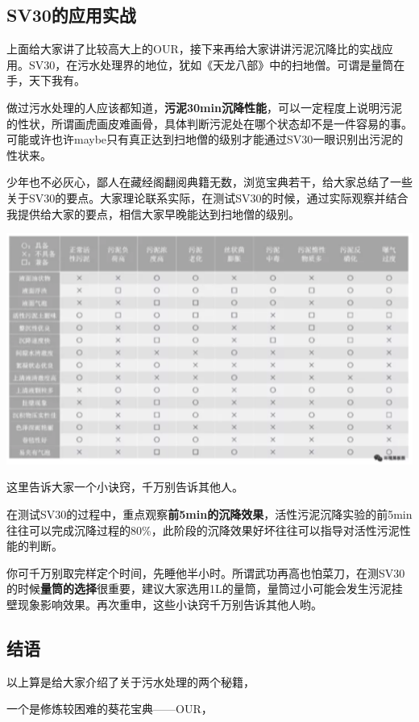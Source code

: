 \documentclass[]{book}
\begin{document}
\subsection{SV30的应用实战}\label{sv30}

上面给大家讲了比较高大上的OUR，接下来再给大家讲讲污泥沉降比的实战应用。SV30，在污水处理界的地位，犹如《天龙八部》中的扫地僧。可谓是量筒在手，天下我有。

做过污水处理的人应该都知道，\textbf{污泥30min沉降性能}，可以一定程度上说明污泥的性状，所谓画虎画皮难画骨，具体判断污泥处在哪个状态却不是一件容易的事。可能或许也许maybe只有真正达到扫地僧的级别才能通过SV30一眼识别出污泥的性状来。

少年也不必灰心，鄙人在藏经阁翻阅典籍无数，浏览宝典若干，给大家总结了一些关于SV30的要点。大家理论联系实际，在测试SV30的时候，通过实际观察并结合我提供给大家的要点，相信大家早晚能达到扫地僧的级别。

\includegraphics[width=6.67in]{images/os3}

这里告诉大家一个小诀窍，千万别告诉其他人。

在测试SV30的过程中，重点观察\textbf{前5min的沉降效果}，活性污泥沉降实验的前5min往往可以完成沉降过程的80\%，此阶段的沉降效果好坏往往可以指导对活性污泥性能的判断。

你可千万别取完样定个时间，先睡他半小时。所谓武功再高也怕菜刀，在测SV30的时候\textbf{量筒的选择}很重要，建议大家选用1L的量筒，量筒过小可能会发生污泥挂壁现象影响效果。再次重申，这些小诀窍千万别告诉其他人哟。

\subsection{结语}\label{-4}

以上算是给大家介绍了关于污水处理的两个秘籍，

一个是修炼较困难的葵花宝典------OUR，
\end{document}
